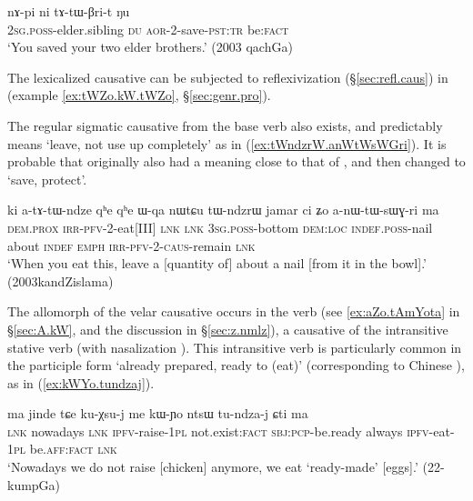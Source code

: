 \begin{exe}
\ex \label{ex:tatWBrit}
 \gll nɤ-pi ni tɤ-tɯ-βri-t ŋu \\
\textsc{2sg}.\textsc{poss}-elder.sibling \textsc{du} \textsc{aor}-2-save-\textsc{pst}:\textsc{tr} be:\textsc{fact} \\
\glt `You saved your two elder brothers.' (2003 qachGa)
\end{exe}

The lexicalized causative  can be subjected to reflexivization (§\ref{sec:refl.caus}) in  (example \ref{ex:tWZo.kW.tWZo}, §\ref{sec:genr.pro}). 

The regular sigmatic causative  from the base verb  also exists, and  predictably means  `leave, not use up completely' as in (\ref{ex:tWndzrW.anWtWsWGri}). It is probable that  originally also had a meaning close to that of , and then changed to `save, protect'.   
 
\begin{exe}
\ex \label{ex:tWndzrW.anWtWsWGri}
 \gll ki a-tɤ-tɯ-ndze qʰe qʰe ɯ-qa nɯtɕu tɯ-ndzrɯ jamar ci ʑo a-nɯ-tɯ-sɯɣ-ri ma \\
 \textsc{dem}.\textsc{prox} \textsc{irr}-\textsc{pfv}-2-eat[III] \textsc{lnk} \textsc{lnk} \textsc{3sg}.\textsc{poss}-bottom \textsc{dem}:\textsc{loc} \textsc{indef}.\textsc{poss}-nail about \textsc{indef} \textsc{emph}  \textsc{irr}-\textsc{pfv}-2-\textsc{caus}-remain \textsc{lnk} \\
\glt `When you eat this, leave a [quantity of] about a nail [from it in the bowl].' (2003kandZislama)
\end{exe}
 
The  allomorph of the velar causative occurs in the verb  (see \ref{ex:aZo.tAmYota} in §\ref{sec:A.kW}, and the discussion in §\ref{sec:z.nmlz}), a causative of the intransitive stative verb  (with nasalization  \fl{} ). This  intransitive verb is particularly common in the participle form  `already prepared, ready to (eat)' (corresponding to Chinese ), as in (\ref{ex:kWYo.tundzaj}).  

\begin{exe}
\ex \label{ex:kWYo.tundzaj}
 \gll ma jinde tɕe ku-χsu-j me kɯ-ɲo ntsɯ tu-ndza-j ɕti ma \\
 \textsc{lnk} nowadays \textsc{lnk} \textsc{ipfv}-raise-\textsc{1pl} not.exist:\textsc{fact} \textsc{sbj}:\textsc{pcp}-be.ready always \textsc{ipfv}-eat-\textsc{1pl} be.\textsc{aff}:\textsc{fact} \textsc{lnk} \\
 \glt `Nowadays we do not raise [chicken] anymore, we eat `ready-made' [eggs].'  (22-kumpGa)
 \end{exe}
 
